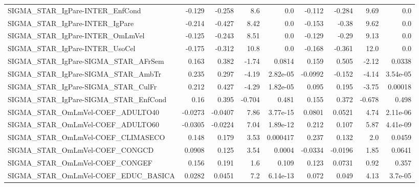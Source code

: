 \begin{tabular}{lrrrrrrrr}
SIGMA\_STAR\_IgPare-INTER\_EnfCond       &      -0.129 &       -0.258 &      8.6 &      0.0 &     -0.112 &      -0.284 &         9.69 &           0.0 \\
SIGMA\_STAR\_IgPare-INTER\_IgPare        &      -0.214 &       -0.427 &     8.42 &      0.0 &     -0.153 &       -0.38 &         9.62 &           0.0 \\
SIGMA\_STAR\_IgPare-INTER\_OmLmVel       &      -0.125 &       -0.243 &     8.51 &      0.0 &     -0.129 &       -0.29 &         9.13 &           0.0 \\
SIGMA\_STAR\_IgPare-INTER\_UsoCel        &      -0.175 &       -0.312 &     10.8 &      0.0 &     -0.168 &      -0.361 &         12.0 &           0.0 \\
SIGMA\_STAR\_IgPare-SIGMA\_STAR\_AFrSem   &       0.163 &        0.382 &    -1.74 &   0.0814 &      0.159 &       0.505 &        -2.12 &        0.0338 \\
SIGMA\_STAR\_IgPare-SIGMA\_STAR\_AmbTr    &       0.235 &        0.297 &    -4.19 & 2.82e-05 &    -0.0992 &      -0.152 &        -4.14 &      3.54e-05 \\
SIGMA\_STAR\_IgPare-SIGMA\_STAR\_CulFr    &       0.212 &        0.427 &    -4.29 & 1.82e-05 &      0.095 &       0.195 &        -3.75 &       0.00018 \\
SIGMA\_STAR\_IgPare-SIGMA\_STAR\_EnfCond  &        0.16 &        0.395 &   -0.704 &    0.481 &      0.155 &       0.372 &       -0.678 &         0.498 \\
SIGMA\_STAR\_OmLmVel-COEF\_ADULTO40      &     -0.0273 &      -0.0407 &     7.86 & 3.77e-15 &     0.0801 &      0.0521 &         4.74 &      2.11e-06 \\
SIGMA\_STAR\_OmLmVel-COEF\_ADULTO60      &     -0.0305 &      -0.0224 &     7.04 & 1.89e-12 &      0.212 &       0.107 &         5.87 &      4.41e-09 \\
SIGMA\_STAR\_OmLmVel-COEF\_CLIMASECO     &       0.148 &        0.179 &     3.53 & 0.000417 &      0.237 &       0.132 &          2.0 &        0.0459 \\
SIGMA\_STAR\_OmLmVel-COEF\_CONGCD        &      0.0908 &        0.125 &     3.54 &   0.0004 &    -0.0334 &     -0.0196 &         1.85 &        0.0641 \\
SIGMA\_STAR\_OmLmVel-COEF\_CONGEF        &       0.156 &        0.191 &      1.6 &    0.109 &      0.123 &      0.0731 &         0.92 &         0.357 \\
SIGMA\_STAR\_OmLmVel-COEF\_EDUC\_BASICA   &      0.0282 &       0.0451 &      7.2 & 6.14e-13 &      0.072 &       0.049 &         4.13 &       3.7e-05 \\

\end{tabular}
